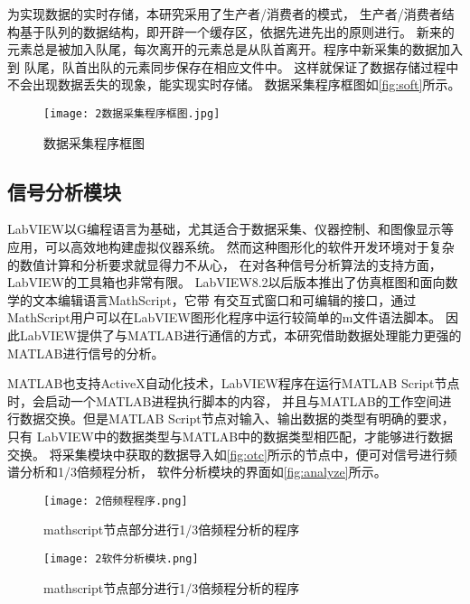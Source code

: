 为实现数据的实时存储，本研究采用了生产者/消费者的模式，
生产者/消费者结构基于队列的数据结构，即开辟一个缓存区，依据先进先出的原则进行。
新来的元素总是被加入队尾，每次离开的元素总是从队首离开。程序中新采集的数据加入到
队尾，队首出队的元素同步保存在相应文件中。
这样就保证了数据存储过程中不会出现数据丢失的现象，能实现实时存储。
数据采集程序框图如\autoref{fig:soft}所示。
\begin{figure}[htbp]
    \centering
    \texttt{[image: 2数据采集程序框图.jpg]}
    \caption{\label{fig:soft}数据采集程序框图}
\end{figure}


\subsection{信号分析模块}
LabVIEW以G编程语言为基础，尤其适合于数据采集、仪器控制、和图像显示等应用，可以高效地构建虚拟仪器系统。
然而这种图形化的软件开发环境对于复杂的数值计算和分析要求就显得力不从心，
在对各种信号分析算法的支持方面，LabVIEW的工具箱也非常有限。
LabVIEW8.2以后版本推出了仿真框图和面向数学的文本编辑语言MathScript，它带
有交互式窗口和可编辑的接口，通过MathScript用户可以在LabVIEW图形化程序中运行较简单的m文件语法脚本。
因此LabVIEW提供了与MATLAB进行通信的方式，本研究借助数据处理能力更强的MATLAB进行信号的分析。

MATLAB也支持ActiveX自动化技术，LabVIEW程序在运行MATLAB Script节点时，会启动一个MATLAB进程执行脚本的内容，
并且与MATLAB的工作空间进行数据交换。但是MATLAB Script节点对输入、输出数据的类型有明确的要求，只有
LabVIEW中的数据类型与MATLAB中的数据类型相匹配，才能够进行数据交换。
将采集模块中获取的数据导入如\autoref{fig:otc}所示的节点中，便可对信号进行频谱分析和1/3倍频程分析，
软件分析模块的界面如\autoref{fig:analyze}所示。
\begin{figure}[htbp]
    \centering
    \texttt{[image: 2倍频程程序.png]}
    \caption{\label{fig:otc}mathscript节点部分进行1/3倍频程分析的程序}
\end{figure}

\begin{figure}[htbp]
    \centering
    \texttt{[image: 2软件分析模块.png]}
    \caption{\label{fig:analyze}mathscript节点部分进行1/3倍频程分析的程序}
\end{figure}

